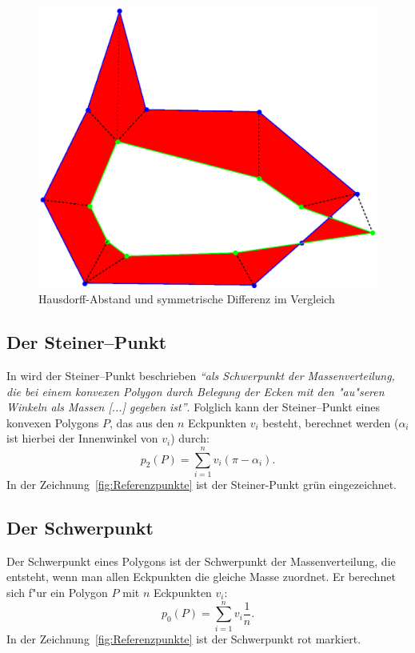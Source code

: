 \begin{figure}
	\centering
	\includegraphics[scale=.6]{Metrikengestoert.eps}
	\caption{Hausdorff-Abstand und symmetrische Differenz im Vergleich}
	\label{fig:VergleichMetrik}
\end{figure}


\subsection{Der Steiner--Punkt}\label{Steinerpunkt}

In \cite{Sch} wird der Steiner--Punkt beschrieben \textit{"`als Schwerpunkt der Massenverteilung, die bei einem konvexen Polygon durch Belegung der Ecken mit den "au"seren Winkeln als Massen [...] gegeben ist"'}. Folglich kann der Steiner--Punkt eines konvexen Polygons $P$, das aus den $n$ Eckpunkten $v_i$ besteht, berechnet werden ($\alpha_i$ ist hierbei der Innenwinkel von $v_i$) durch:
\[p_2(P)=\sum^n_{i=1}v_i (\pi-\alpha_i).\]
In der Zeichnung~\ref{fig:Referenzpunkte} ist der Steiner-Punkt grün eingezeichnet.


\subsection{Der Schwerpunkt}\label{Schwerp}

Der Schwerpunkt eines Polygons ist der Schwerpunkt der Massenverteilung, die entsteht, wenn man allen Eckpunkten die gleiche Masse zuordnet. Er berechnet sich f"ur ein Polygon $P$ mit $n$ Eckpunkten $v_i$:
\[p_0(P)=\sum^n_{i=1}v_i \frac{1}{n}.\]
In der Zeichnung~\ref{fig:Referenzpunkte} ist der Schwerpunkt rot markiert. 

